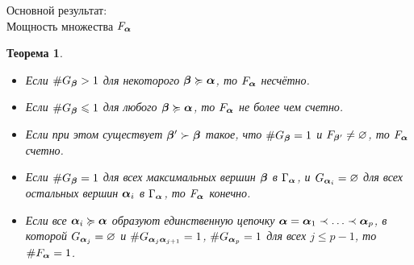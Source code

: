 \documentclass[aspectratio=1610, 10pt, notheorems]{beamer}
\newtheorem{theorem}     {Теорема}
\begin{document}
\begin{frame}{Основной результат:\\Мощность множества $F_{\bm{\alpha}}$}
\begin{theorem}
\begin{itemize} %
\item[(1)] Если $\#G_{\bm{\beta}}>1$ для некоторого ${\bm{\beta}}\succcurlyeq{\bm{\alpha}}$, то  $F_{\bm{\alpha}}$ несчётно.

\item[(2a)] Если  $\#G_{\bm{\beta}}\leqslant1$ для любого ${\bm{\beta}}\succcurlyeq{\bm{\alpha}}$, то  $F_{\bm{\alpha}}$ не более чем счетно.

\item[(2b)] Если при этом существует ${\bm{\beta}}'\succ{\bm{\beta}}$ такое, что $\#G_{\bm{\beta}}=1$ и $F_{{\bm{\beta}}'}\neq\varnothing$, то $F_{\bm{\alpha}}$ счетно.

\item[(3)] Если  $\#G_{\bm{\beta}}=1$ для всех максимальных вершин ${\bm{\beta}}$ в $\Gamma_{\bm{\alpha}}$, и $G_{{\bm{\alpha}}_i}=\varnothing$ для всех остальных вершин ${\bm{\alpha}}_i$ в $\Gamma_{\bm{\alpha}}$, то $F_{\bm{\alpha}}$ конечно.

\item[(4)] Если все ${\bm{\alpha}}_i\succcurlyeq{\bm{\alpha}}$ образуют единственную цепочку ${\bm{\alpha}}={\bm{\alpha}}_1\prec\ldots\prec{\bm{\alpha}}_p$, в которой $G_{{\bm{\alpha}}_j}=\varnothing$ и $\# G_{{\bm{\alpha}}_j{\bm{\alpha}}_{j+1}}=1$, $\#G_{{\bm{\alpha}}_p}=1$ для всех $j\le p-1$, то $\#F_{\bm{\alpha}}=1$.
\end{itemize}
\end{theorem}
\end{frame}
\end{document}
